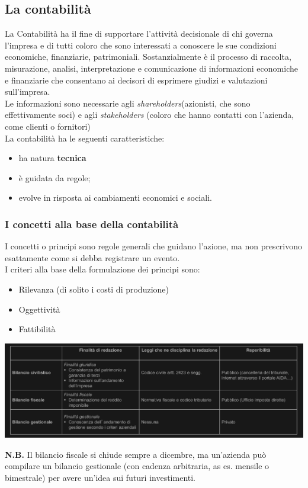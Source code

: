 \documentclass{article}
\begin{document}
\subsection{La contabilità}
La Contabilità ha il fine di supportare
l'attività decisionale di chi governa
l'impresa e di tutti coloro che sono
interessati a conoscere le sue condizioni
economiche, finanziarie, patrimoniali. Sostanzialmente è il
processo di raccolta, misurazione, analisi,
interpretazione e comunicazione di
informazioni economiche e finanziarie che
consentano ai decisori di esprimere giudizi
e valutazioni sull'impresa.\\
Le informazioni sono necessarie agli \textit{shareholders}(azionisti, che sono effettivamente soci) e agli \textit{stakeholders} (coloro che hanno contatti con l'azienda, come clienti o fornitori)
\vspace*{0.1cm}\\
La contabilità ha le
seguenti caratteristiche: 
\begin{itemize}
    \item ha natura \textbf{tecnica}
    \item è guidata da regole;
    \item evolve in risposta ai cambiamenti
    economici e sociali.
\end{itemize}


\subsubsection{I concetti alla base
della contabilità}
I concetti o principi sono regole generali
che guidano l'azione, ma non prescrivono
esattamente come si debba registrare un
evento.
\vspace*{0.1cm}\\
I criteri alla base della formulazione dei
principi sono:
\begin{itemize}
	\item Rilevanza (di solito i costi di produzione)
    \item Oggettività
    \item Fattibilità
\end{itemize}
\noindent{}
\begin{center}
    \includegraphics[scale=0.4]{Tabella bilancio.png}
\end{center}
\textbf{N.B.} Il bilancio fiscale si chiude sempre a dicembre, ma un'azienda può compilare un bilancio gestionale (con cadenza arbitraria, as es. mensile o bimestrale) per avere un'idea sui futuri investimenti.
\end{document}
